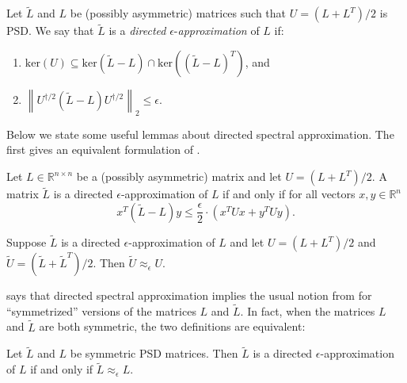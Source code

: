 \documentclass{toc}
\newcommand{\wt}{\widetilde}   %
\numberwithin{myalgctr}{section}
\theoremstyle{named}
\begin{document}
\begin{definition}
\label{def:dirapprox}
Let $\wt{L}$ and $L$ be (possibly asymmetric) matrices such that $U=(L+L^T)/2$ is PSD. We say that $\wt{L}$ is a \emph{directed} $\epsilon$-\emph{approximation} of $L$ if:
\begin{enumerate}
\item $\mathrm{ker}(U)\subseteq \mathrm{ker}(\wt{L}-L)\cap\mathrm{ker}((\wt{L}-L)^T)$, and
\item $\left\|U^{\dagger/2}(\wt{L}-L)U^{\dagger/2}\right\|_2 \leq \epsilon$.
\end{enumerate}
\end{definition}
Below we state some useful lemmas about directed spectral approximation. The first gives an equivalent formulation of .

\begin{lemma}
\label{lem:dirapprox}
Let $L\in\mathbb{R}^{n\times n}$ be a (possibly asymmetric) matrix and let $U=(L+L^T)/2$. A matrix $\wt{L}$ is a directed $\epsilon$-approximation of $L$ if and only if for all vectors $x,y\in\mathbb{R}^n$
\[
x^T(\wt{L}-L)y\leq \frac{\epsilon}{2}\cdot(x^TUx + y^TUy).
\]
\end{lemma}

\begin{lemma}
\label{lem:dir_implies_undir}
Suppose $\wt{L}$ is a directed $\epsilon$-approximation of $L$ and let $U=(L+L^T)/2$ and $\wt{U}=(\wt{L}+\wt{L}^T)/2$. Then $\wt{U}\approx_{\epsilon}U$.
\end{lemma}

 says that directed spectral approximation implies the usual notion from  for ``symmetrized'' versions of the matrices $L$ and $\wt{L}$. In fact, when the matrices $L$ and $\wt{L}$ are both symmetric, the two definitions are equivalent:
\begin{lemma}
\label{lem:symmequiv}
Let $\wt{L}$ and $L$ be symmetric PSD matrices. Then $\wt{L}$ is a directed $\epsilon$-approximation of $L$ if and only if $\wt{L}\approx_{\epsilon}L$.
\end{lemma}
\end{document}
